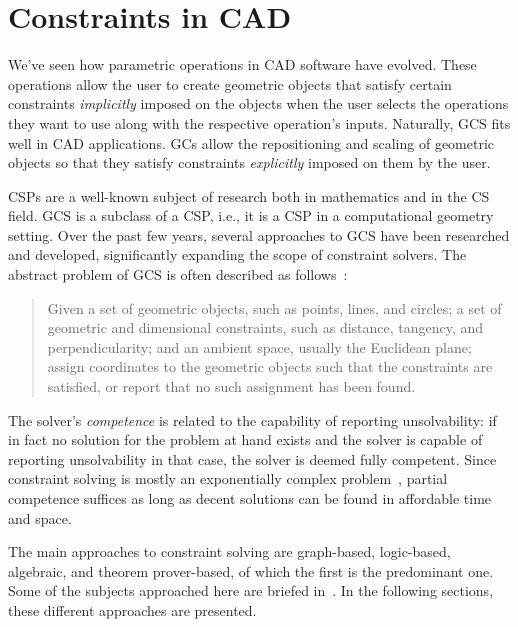 \section{Constraints in \acs{CAD}}%
\label{sec:intro.constraints}

We've seen how parametric operations in \ac{CAD} software have evolved.  These
operations allow the user to create geometric objects that satisfy certain
constraints \textit{implicitly} imposed on the objects when the user selects the
operations they want to use along with the respective operation's inputs.
Naturally, \ac{GCS} fits well in \ac{CAD} applications.  \Acp{GC} allow the
repositioning and scaling of geometric objects so that they satisfy constraints
\textit{explicitly} imposed on them by the user.

\acp{CSP} are a well-known subject of research both in mathematics and in the
\ac{CS} field.  \ac{GCS} is a subclass of a \ac{CSP}, i.e., it is a \ac{CSP} in
a computational geometry setting.  Over the past few years, several approaches to
\ac{GCS} have been researched and developed, significantly expanding the scope
of constraint solvers.  The abstract problem of \ac{GCS} is often described as
follows~\cite{Bettig:2011:GCSPC:1.3593408}:

\begin{quote}
  Given a set of geometric objects, such as points, lines, and circles; a set of
  geometric and dimensional constraints, such as distance, tangency, and
  perpendicularity; and an ambient space, usually the Euclidean plane; assign
  coordinates to the geometric objects such that the constraints are satisfied,
  or report that no such assignment has been found.
\end{quote}

The solver's \textit{competence} is related to the capability of reporting
unsolvability: if in fact no solution for the problem at hand exists and the
solver is capable of reporting unsolvability in that case, the solver is deemed
fully competent.  Since constraint solving is mostly an exponentially complex
problem~\cite{Rossi:2006:Handbook}, partial competence suffices as long as
decent solutions can be found in affordable time and space.

The main approaches to constraint solving are graph-based, logic-based,
algebraic, and theorem prover-based, of which the first is the predominant one.
Some of the subjects approached here are briefed in~\cite{Hoffmann:2005:BCS}.
In the following sections, these different approaches are presented.

